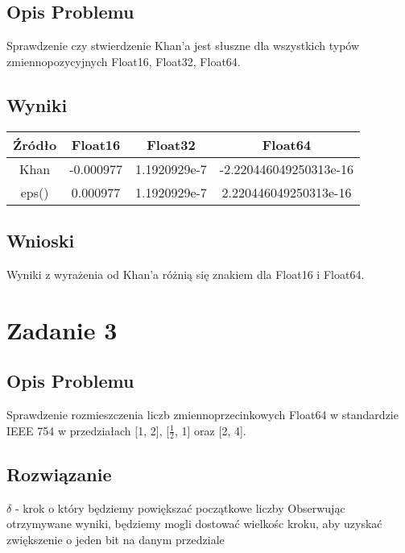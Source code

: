 \documentclass{article}
\begin{document}
\subsection{Opis Problemu}
    Sprawdzenie czy stwierdzenie Khan'a jest słuszne dla wszystkich typów zmiennopozycyjnych Float16, Float32, Float64.
\subsection{Wyniki}
    \begin{center}
        \begin{tabular}{|c||c|c|c|}
        \hline
            Źródło & Float16 & Float32 & Float64 \\
            \hline\hline
            Khan & -0.000977 & 1.1920929e-7 & -2.220446049250313e-16\\
            \hline
            eps() & 0.000977 & 1.1920929e-7 & 2.220446049250313e-16\\
        \hline
        \end{tabular}
    \end{center}
\subsection{Wnioski}
    Wyniki z wyrażenia od Khan'a różnią się znakiem dla Float16 i Float64.

\section{Zadanie 3}
\subsection{Opis Problemu}
	Sprawdzenie rozmieszczenia liczb zmiennoprzecinkowych Float64 w standardzie IEEE 754 w przedziałach [1, 2], [$\frac{1}{2}$, 1] oraz [2, 4].
\subsection{Rozwiązanie}
	$\delta$ - krok o który będziemy powiększać początkowe liczby
    Obserwując otrzymywane wyniki, będziemy mogli dostować wielkośc kroku, aby uzyskać zwiększenie o jeden bit na danym przedziale
\end{document}
